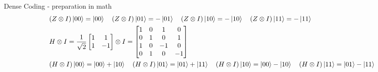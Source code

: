 \documentclass{beamer}
\begin{document}
\begin{frame}{Dense Coding - preparation in math}
{\begin{align*}
      & (Z \otimes I) \ket{00} = \ket{00}
      \quad
      (Z \otimes I) \ket{01} = -\ket{01}
      \quad
      (Z \otimes I) \ket{10} = -\ket{10}
      \quad
      (Z \otimes I) \ket{11} = -\ket{11}
      \\
      & H \otimes I =
      \frac{1}{\sqrt{2}} \begin{bmatrix} 1 & 1 \\ 1 & -1 \end{bmatrix} 
      \otimes I
      =
      \begin{bmatrix}
        1 & 0 & 1 & 0 \\
        0 & 1 & 0 & 1 \\
        1 & 0 & -1 & 0 \\
        0 & 1 & 0 & -1 \\
      \end{bmatrix} 
      \\
      & (H \otimes I) \ket{00} = \ket{00} + \ket{10}
      \quad
      (H \otimes I) \ket{01} = \ket{01} + \ket{11}
      \quad
      (H \otimes I) \ket{10} = \ket{00} -\ket{10}
      \quad
      (H \otimes I) \ket{11} = \ket{01} - \ket{11}
    \end{align*}
    }%
\end{frame}
\end{document}
